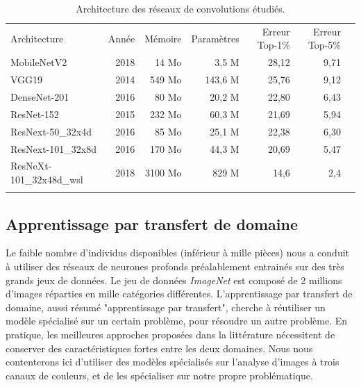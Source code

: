 \begin{table}[hbtp]
	\centering
	\begin{tabular}{|l|r|r|r|r|r|r|}
		\hhline{------}
		Architecture             & Année & Mémoire & Paramètres & Erreur Top-1\% & Erreur Top-5\% \\
		\hhline{=:=:=:=:=:=} %
		MobileNetV2              & 2018  & 14 Mo   & 3,5 M      & 28,12          & 9,71           \\ \hline
		VGG19                    & 2014  & 549 Mo  & 143,6 M    & 25,76          & 9,12           \\ \hline
		DenseNet-201             & 2016  & 80 Mo   & 20,2 M     & 22,80          & 6,43           \\ \hline
		ResNet-152               & 2015  & 232 Mo  & 60,3 M     & 21,69          & 5,94           \\ \hline
		ResNext-50\_32x4d        & 2016  & 85 Mo   & 25,1 M     & 22,38          & 6,30           \\ \hline
		ResNext-101\_32x8d       & 2016  & 170 Mo  & 44,3 M     & 20,69          & 5,47          \\ \hline
		ResNeXt-101\_32x48d\_wsl & 2018  & 3100 Mo & 829 M      & 14,6           &     2,4           \\
		\hhline{------}
	\end{tabular}
	\caption{Architecture des réseaux de convolutions étudiés.}
	\label{tab:deep_models}
\end{table}


\subsection{Apprentissage par transfert de domaine} \label{subsec:transfer_learning}

Le faible nombre d'individus disponibles (inférieur à mille pièces) nous a conduit à utiliser des réseaux de neurones profonds préalablement entrainés sur des très grands jeux de données.
Le jeu de données \textit{ImageNet} \cite{deng_imagenet_2009} est composé de 2 millions d'images réparties en mille catégories différentes.
L'apprentissage par transfert de domaine, aussi résumé "apprentissage par transfert", cherche à réutiliser un modèle spécialisé sur un certain problème, pour résoudre un autre problème.
En pratique, les meilleures approches proposées dans la littérature nécessitent de conserver des caractéristiques fortes entre les deux domaines.
Nous nous contenterons ici d'utiliser des modèles spécialisés sur l'analyse d'images à trois canaux de couleurs, et de les spécialiser sur notre propre problématique.

